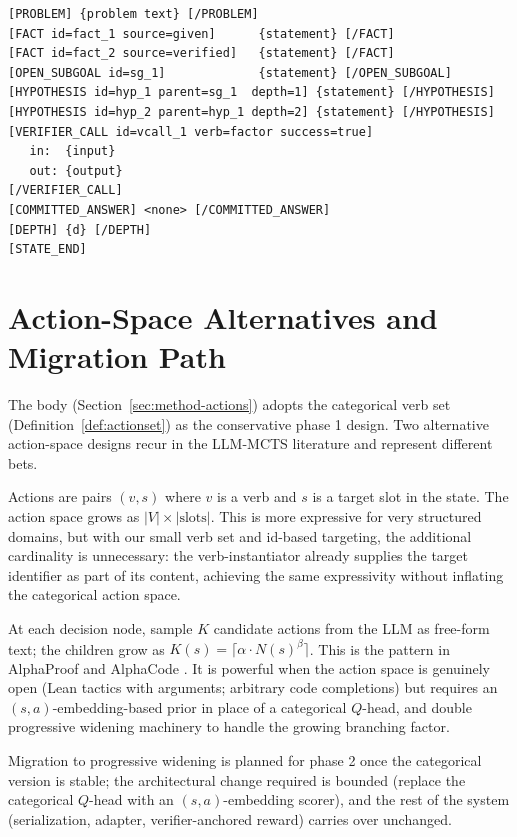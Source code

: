 \begin{lstlisting}[basicstyle=\ttfamily\footnotesize]
[PROBLEM] {problem text} [/PROBLEM]
[FACT id=fact_1 source=given]      {statement} [/FACT]
[FACT id=fact_2 source=verified]   {statement} [/FACT]
[OPEN_SUBGOAL id=sg_1]             {statement} [/OPEN_SUBGOAL]
[HYPOTHESIS id=hyp_1 parent=sg_1  depth=1] {statement} [/HYPOTHESIS]
[HYPOTHESIS id=hyp_2 parent=hyp_1 depth=2] {statement} [/HYPOTHESIS]
[VERIFIER_CALL id=vcall_1 verb=factor success=true]
   in:  {input}
   out: {output}
[/VERIFIER_CALL]
[COMMITTED_ANSWER] <none> [/COMMITTED_ANSWER]
[DEPTH] {d} [/DEPTH]
[STATE_END]
\end{lstlisting}

\section{Action-Space Alternatives and Migration Path}
\label{app:action-alternatives}

The body (Section~\ref{sec:method-actions}) adopts the categorical
verb set (Definition~\ref{def:actionset}) as the
conservative phase 1 design. Two alternative action-space designs recur
in the LLM-MCTS literature and represent different bets.

\begin{description}[leftmargin=*, style=nextline]
  \item[Verb $\times$ slot.]
  Actions are pairs $(v, s)$ where $v$ is a verb and $s$ is a target
  slot in the state. The action space grows as
  $|V| \times |\text{slots}|$. This is more expressive for very
  structured domains, but with our small verb set and id-based
  targeting, the additional cardinality is unnecessary: the
  verb-instantiator already supplies the target identifier as part of
  its content, achieving the same expressivity without inflating the
  categorical action space.
  \item[Progressive widening with LLM-proposed candidates.]
  At each decision node, sample $K$ candidate actions from the LLM as
  free-form text; the children grow as
  $K(s) = \lceil \alpha \cdot N(s)^{\beta} \rceil$. This is the
  pattern in AlphaProof \citep{deepmind2024alphaproof} and AlphaCode
  \citep{li2022alphacode}. It is powerful when the action space is
  genuinely open (Lean tactics with arguments; arbitrary code
  completions) but requires an $(s, a)$-embedding-based prior in place
  of a categorical $Q$-head, and double progressive widening machinery
  to handle the growing branching factor.
\end{description}

Migration to progressive widening is planned for phase 2 once the
categorical version is stable; the architectural change required is
bounded (replace the categorical $Q$-head with an
$(s, a)$-embedding scorer), and the rest of the system
(serialization, adapter, verifier-anchored reward) carries over
unchanged.
